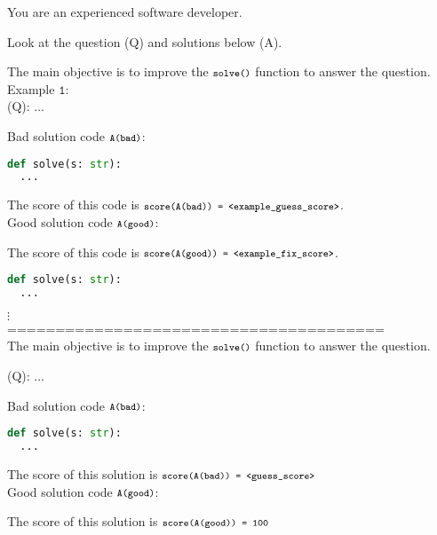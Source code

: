 \documentclass[11pt, a4paper, logo, copyright]{googledeepmind}
\begin{document}
\begin{tcolorbox}[colback=blue!5!white,colframe=black,title= Repair Prompt,fonttitle=\bfseries]\label{fig:repair_prompt}
You are an experienced software developer.

Look at the question (Q) and solutions below (A).

The main objective is to improve the $\texttt{\footnotesize solve()}$ function to answer the question.\\

Example $\texttt{1}$:\\

(Q): ...

Bad solution code $\texttt{\footnotesize A(bad)}$:

\begin{lstlisting}[language=Python,basicstyle=\footnotesize\ttfamily]
def solve(s: str):
  ...
\end{lstlisting}

The score of this code is $\texttt{\footnotesize score(A(bad)) =  <example\_guess\_score>}$.\\

Good solution code $\texttt{\footnotesize A(good)}$:

The score of this code is $\texttt{\footnotesize score(A(good)) =  <example\_fix\_score>}$.

\begin{lstlisting}[language=Python,basicstyle=\footnotesize\ttfamily]
def solve(s: str):
  ...
\end{lstlisting}

$\vdots$\\

=======================================\\

The main objective is to improve the $\texttt{\footnotesize solve()}$ function to answer the question.

(Q): ...

Bad solution code $\texttt{\footnotesize A(bad)}$:

\begin{lstlisting}[language=Python,basicstyle=\footnotesize\ttfamily]
def solve(s: str):
  ...
\end{lstlisting}

The score of this solution is $\texttt{\footnotesize score(A(bad)) =  <guess\_score>}$\\

Good solution code $\texttt{\footnotesize A(good)}$:

The score of this solution is $\texttt{\footnotesize score(A(good)) = 100}$
\\

\end{tcolorbox}
\end{document}
